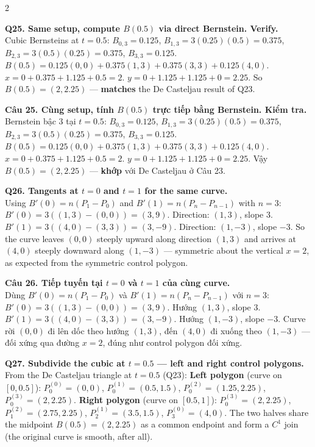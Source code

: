 \begin{paracol}{2}
\switchcolumn*

\textbf{Q25. Same setup, compute $B(0.5)$ via direct Bernstein. Verify.}\\
Cubic Bernsteins at $t=0.5$: $B_{0,3}=0.125$, $B_{1,3}=3(0.25)(0.5)=0.375$, $B_{2,3}=3(0.5)(0.25)=0.375$, $B_{3,3}=0.125$.
$B(0.5)=0.125(0,0)+0.375(1,3)+0.375(3,3)+0.125(4,0)$.
$x = 0 + 0.375 + 1.125 + 0.5 = 2$.
$y = 0 + 1.125 + 1.125 + 0 = 2.25$.
So $B(0.5)=(2, 2.25)$ — \textbf{matches} the De Casteljau result of Q23.

\switchcolumn

\textbf{Câu 25. Cùng setup, tính $B(0.5)$ trực tiếp bằng Bernstein. Kiểm tra.}\\
Bernstein bậc 3 tại $t=0.5$: $B_{0,3}=0.125$, $B_{1,3}=3(0.25)(0.5)=0.375$, $B_{2,3}=3(0.5)(0.25)=0.375$, $B_{3,3}=0.125$.
$B(0.5)=0.125(0,0)+0.375(1,3)+0.375(3,3)+0.125(4,0)$.
$x = 0 + 0.375 + 1.125 + 0.5 = 2$.
$y = 0 + 1.125 + 1.125 + 0 = 2.25$.
Vậy $B(0.5)=(2, 2.25)$ — \textbf{khớp} với De Casteljau ở Câu 23.

\switchcolumn*

\textbf{Q26. Tangents at $t=0$ and $t=1$ for the same curve.}\\
Using $B'(0)=n(P_1-P_0)$ and $B'(1)=n(P_n-P_{n-1})$ with $n=3$:
$B'(0)=3((1,3)-(0,0))=(3, 9)$. Direction: $(1,3)$, slope $3$.
$B'(1)=3((4,0)-(3,3))=(3, -9)$. Direction: $(1,-3)$, slope $-3$.
So the curve leaves $(0,0)$ steeply upward along direction $(1,3)$ and arrives at $(4,0)$ steeply downward along $(1,-3)$ — symmetric about the vertical $x=2$, as expected from the symmetric control polygon.

\switchcolumn

\textbf{Câu 26. Tiếp tuyến tại $t=0$ và $t=1$ của cùng curve.}\\
Dùng $B'(0)=n(P_1-P_0)$ và $B'(1)=n(P_n-P_{n-1})$ với $n=3$:
$B'(0)=3((1,3)-(0,0))=(3, 9)$. Hướng $(1,3)$, slope $3$.
$B'(1)=3((4,0)-(3,3))=(3, -9)$. Hướng $(1,-3)$, slope $-3$.
Curve rời $(0,0)$ đi lên dốc theo hướng $(1,3)$, đến $(4,0)$ đi xuống theo $(1,-3)$ — đối xứng qua đường $x=2$, đúng như control polygon đối xứng.

\switchcolumn*

\textbf{Q27. Subdivide the cubic at $t=0.5$ — left and right control polygons.}\\
From the De Casteljau triangle at $t=0.5$ (Q23):
\textbf{Left polygon} (curve on $[0, 0.5]$): $P_0^{(0)}=(0,0)$, $P_0^{(1)}=(0.5,1.5)$, $P_0^{(2)}=(1.25,2.25)$, $P_0^{(3)}=(2,2.25)$.
\textbf{Right polygon} (curve on $[0.5, 1]$): $P_0^{(3)}=(2,2.25)$, $P_1^{(2)}=(2.75,2.25)$, $P_2^{(1)}=(3.5,1.5)$, $P_3^{(0)}=(4,0)$.
The two halves share the midpoint $B(0.5)=(2, 2.25)$ as a common endpoint and form a $C^1$ join (the original curve is smooth, after all).


\end{paracol}

